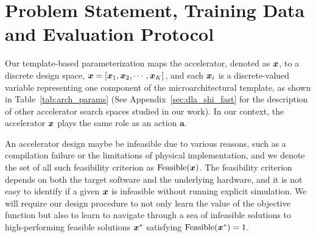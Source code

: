 \vspace{-0.2cm}
\section{Problem Statement, Training Data and Evaluation Protocol}
\label{sec:accel}
\vspace{-0.1cm}
%
Our template-based parameterization maps the accelerator, denoted as ${\boldsymbol{x}}$, to a discrete design space, ${\boldsymbol{x}} = [{\boldsymbol{x}}_1, {\boldsymbol{x}}_2, \cdots, {\boldsymbol{x}}_K]$, and each ${\boldsymbol{x}}_i$ is a discrete-valued variable representing one component of the microarchitectural template, as shown in Table~\ref{tab:arch_params} (See Appendix~\ref{sec:dla_shi_fast} for the description of other accelerator search spaces studied in our work). In our context, the accelerator ${\boldsymbol{x}}$ plays the same role as an action $\mathbf{a}$.

%
An accelerator design maybe be infeasible due to various reasons, such as a compilation failure or the limitations of physical implementation, and we denote the set of all such feasibility criterion as $\mathrm{Feasible}({\boldsymbol{x}})$. The feasibility criterion depends on both the target software and the underlying hardware, and it is not easy to identify if a given ${\boldsymbol{x}}$ is infeasible without running explicit simulation. We will require our design procedure to not only learn the value of the objective function but also to learn to navigate through a sea of infeasible solutions to high-performing feasible solutions ${\boldsymbol{x}}^*$ satisfying $\mathrm{Feasible}({\boldsymbol{x}}^*) = 1$. 

